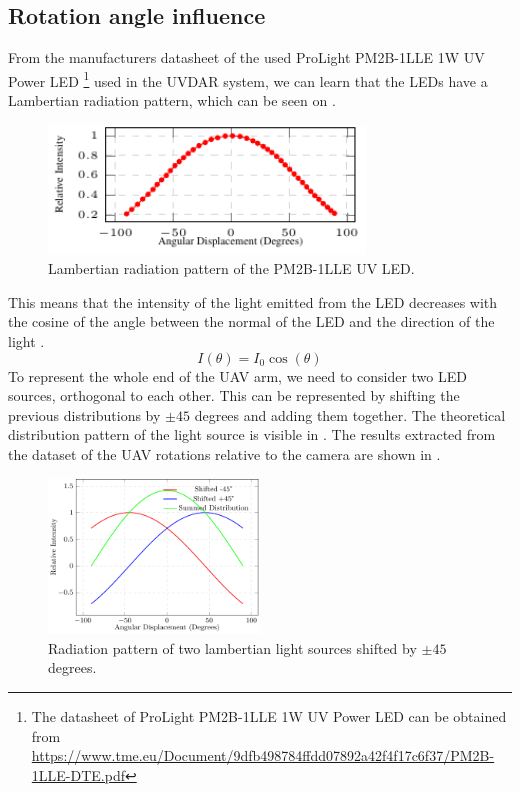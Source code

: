\subsection{Rotation angle influence}
From the manufacturers datasheet of the used ProLight PM2B-1LLE 1W \ac{UV} Power \ac{LED} \footnote{The datasheet of ProLight PM2B-1LLE 1W UV Power LED can be obtained from \url{https://www.tme.eu/Document/9dfb498784ffdd07892a42f4f17c6f37/PM2B-1LLE-DTE.pdf}}
used in the UVDAR system, we can learn that the \ac{LED}s have a Lambertian radiation pattern,
which can be seen on .
\begin {figure}[H]
	\centering
	\includegraphics[width=0.75\textwidth]{./fig/semestral/lambertian/lambertian.pdf}
	\caption{Lambertian radiation pattern of the PM2B-1LLE UV LED.}
	\label{fig:lambertian}
\end{figure}
This means that the intensity of the light emitted from the LED decreases with the cosine
of the angle between the normal of the LED and the direction of the light .
\begin{equation}
	I(\theta) = I_0\cos(\theta)
	\label{eq:lambertian}
\end{equation}
To represent the whole end of the \ac{UAV} arm, we need to consider two \ac{LED} sources, orthogonal to each other.
This can be represented by shifting the previous distributions by $\pm 45$ degrees and adding them together. The 
theoretical distribution pattern of the light source is visible in . 
The results extracted from the dataset of the \ac{UAV} rotations relative to the camera are shown in .
\begin {figure}[H]
	\centering
	\includegraphics[width=0.50\textwidth]{./fig/semestral/lambertian/3lambertian.pdf}
	\caption{Radiation pattern of two lambertian light sources shifted by $\pm 45$ degrees.}
	\label{fig:lambert_combined}
\end{figure}

